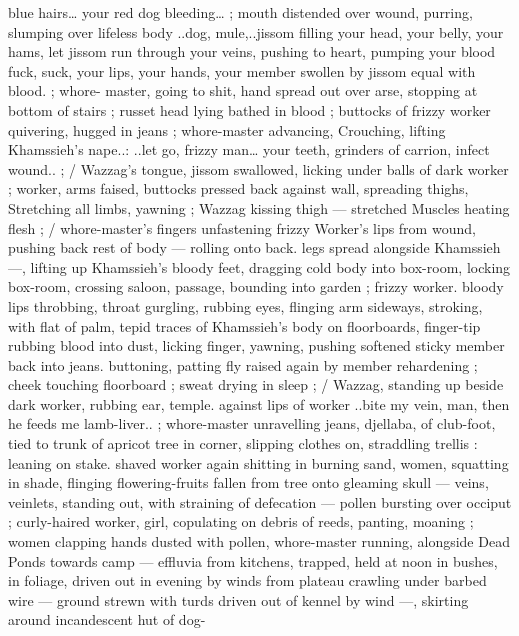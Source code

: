 {blue hairs{\ldots} your red dog bleeding{\ldots}{\gr} ; mouth distended over wound, 
purring, slumping over lifeless body{\td} {\gl}..dog, mule,..jissom filling 
your head, your belly, your hams, let jissom run through your veins, 
pushing to heart, pumping your blood{\td} fuck, suck, your lips, your 
hands, your member swollen by jissom equal with blood.{\gr} ; whore- 
master, going to shit, hand spread out over arse, stopping at bottom 
of stairs ; russet head lying bathed in blood ; buttocks of frizzy 
worker quivering, hugged in jeans ; whore-master advancing, 
Crouching, lifting Khamssieh's nape..: {\gl}..let go, frizzy man{\ldots} your 
teeth, grinders of carrion, infect wound..{\gr} ; {\slash} Wazzag's tongue, 
jissom swallowed, licking under balls of dark worker ; worker, arms 
faised, buttocks pressed back against wall, spreading thighs, 
Stretching all limbs, yawning ; Wazzag kissing thigh --- stretched 
Muscles heating flesh ; {\slash} whore-master's fingers unfastening frizzy 
Worker's lips from wound, pushing back rest of body --- rolling onto 
back. legs spread alongside Khamssieh ---, lifting up Khamssieh's 
bloody feet, dragging cold body into box-room, locking box-room, 
crossing saloon, passage, bounding into garden ; frizzy worker. 
bloody lips throbbing, throat gurgling, rubbing eyes, flinging arm 
sideways, stroking, with flat of palm, tepid traces of Khamssieh's 
body on floorboards, finger-tip rubbing blood into dust, licking 
finger, yawning, pushing softened sticky member back into jeans. 
buttoning, patting fly raised again by member rehardening ; cheek 
touching floorboard ; sweat drying in sleep ; {\slash} Wazzag, standing up 
beside dark worker, rubbing ear, temple. against lips of worker 
{\gl}..bite my vein, man, then he feeds me lamb-liver..{\gr} ; whore-master 
unravelling jeans, djellaba, of club-foot, tied to trunk of apricot tree 
in corner, slipping clothes on, straddling trellis : leaning on stake. 
shaved worker again shitting in burning sand, women, squatting in 
shade, flinging flowering-fruits fallen from tree onto gleaming skull 
--- veins, veinlets, standing out, with straining of defecation --- 
pollen bursting over occiput ; curly-haired worker, girl, copulating on 
debris of reeds, panting, moaning ; women clapping hands dusted 
with pollen, whore-master running, alongside {\gl} Dead Ponds {\gr} 
towards camp --- effluvia from kitchens, trapped, held at noon in 
bushes, in foliage, driven out in evening by winds from plateau 
crawling under barbed wire --- ground strewn with turds driven out 
of kennel by wind ---, skirting around incandescent hut of dog- 
}
